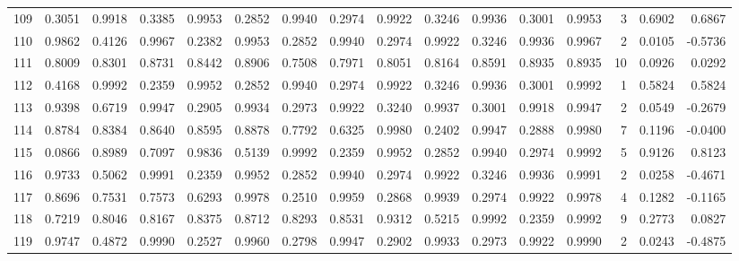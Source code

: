 \begin{tabular}{lrrrrrrrrrrrrrrr}
109 &      0.3051 &  0.9918 &  0.3385 &  0.9953 &  0.2852 &  0.9940 &  0.2974 &  0.9922 &  0.3246 &  0.9936 &   0.3001 &     0.9953 &      3 &                    0.6902 &                     0.6867 \\
110 &      0.9862 &  0.4126 &  0.9967 &  0.2382 &  0.9953 &  0.2852 &  0.9940 &  0.2974 &  0.9922 &  0.3246 &   0.9936 &     0.9967 &      2 &                    0.0105 &                    -0.5736 \\
111 &      0.8009 &  0.8301 &  0.8731 &  0.8442 &  0.8906 &  0.7508 &  0.7971 &  0.8051 &  0.8164 &  0.8591 &   0.8935 &     0.8935 &     10 &                    0.0926 &                     0.0292 \\
112 &      0.4168 &  0.9992 &  0.2359 &  0.9952 &  0.2852 &  0.9940 &  0.2974 &  0.9922 &  0.3246 &  0.9936 &   0.3001 &     0.9992 &      1 &                    0.5824 &                     0.5824 \\
113 &      0.9398 &  0.6719 &  0.9947 &  0.2905 &  0.9934 &  0.2973 &  0.9922 &  0.3240 &  0.9937 &  0.3001 &   0.9918 &     0.9947 &      2 &                    0.0549 &                    -0.2679 \\
114 &      0.8784 &  0.8384 &  0.8640 &  0.8595 &  0.8878 &  0.7792 &  0.6325 &  0.9980 &  0.2402 &  0.9947 &   0.2888 &     0.9980 &      7 &                    0.1196 &                    -0.0400 \\
115 &      0.0866 &  0.8989 &  0.7097 &  0.9836 &  0.5139 &  0.9992 &  0.2359 &  0.9952 &  0.2852 &  0.9940 &   0.2974 &     0.9992 &      5 &                    0.9126 &                     0.8123 \\
116 &      0.9733 &  0.5062 &  0.9991 &  0.2359 &  0.9952 &  0.2852 &  0.9940 &  0.2974 &  0.9922 &  0.3246 &   0.9936 &     0.9991 &      2 &                    0.0258 &                    -0.4671 \\
117 &      0.8696 &  0.7531 &  0.7573 &  0.6293 &  0.9978 &  0.2510 &  0.9959 &  0.2868 &  0.9939 &  0.2974 &   0.9922 &     0.9978 &      4 &                    0.1282 &                    -0.1165 \\
118 &      0.7219 &  0.8046 &  0.8167 &  0.8375 &  0.8712 &  0.8293 &  0.8531 &  0.9312 &  0.5215 &  0.9992 &   0.2359 &     0.9992 &      9 &                    0.2773 &                     0.0827 \\
119 &      0.9747 &  0.4872 &  0.9990 &  0.2527 &  0.9960 &  0.2798 &  0.9947 &  0.2902 &  0.9933 &  0.2973 &   0.9922 &     0.9990 &      2 &                    0.0243 &                    -0.4875 \\

\end{tabular}
